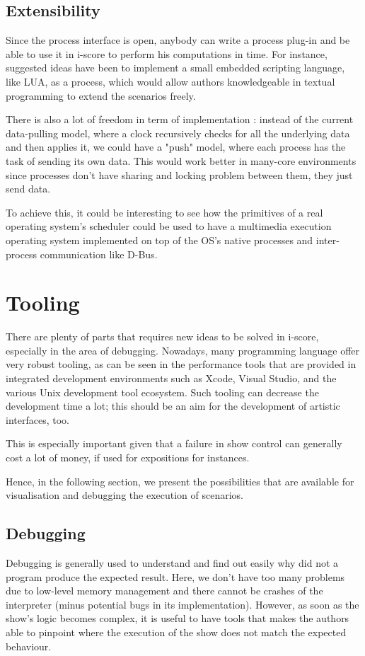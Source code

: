 \documentclass{sigchi}
\begin{document}
\subsection{Extensibility}
Since the process interface is open, anybody can write a process plug-in and be able to use it in i-score to perform his computations in time. For instance, suggested ideas have been to implement a small embedded scripting language, like LUA, as a process, which would allow authors knowledgeable in textual programming to extend the scenarios freely.

There is also a lot of freedom in term of implementation : instead of the current data-pulling model, where a clock recursively checks for all the underlying data and then applies it, we could have a "push" model, where each process has the task of sending its own data. This would work better in many-core environments since processes don't have sharing and locking problem between them, they just send data.

To achieve this, it could be interesting to see how the primitives of a real operating system's scheduler could be used to have a multimedia execution operating system implemented on top of the OS's native processes and inter-process communication like D-Bus.

\section{Tooling}
There are plenty of parts that requires new ideas to be solved in i-score, especially in the area of debugging. Nowadays, many programming language offer very robust tooling, as can be seen in the performance tools that are provided in integrated development environments such as Xcode, Visual Studio, and the various Unix development tool ecosystem\cite{spinellis2014software}. Such tooling can decrease the development time a lot; this should be an aim for the development of artistic interfaces, too.

This is especially important given that a failure in show control can generally cost a lot of money, if used for expositions for instances.

Hence, in the following section, we present the possibilities that are available for visualisation and debugging the execution of scenarios.


\subsection{Debugging}
Debugging is generally used to understand and find out easily why did not a program produce the expected result. Here, we don't have too many problems due to low-level memory management and there cannot be crashes of the interpreter (minus potential bugs in its implementation).  However, as soon as the show's logic becomes complex, it is useful to have tools that makes the authors able to pinpoint where the execution of the show does not match the expected behaviour.
\end{document}
